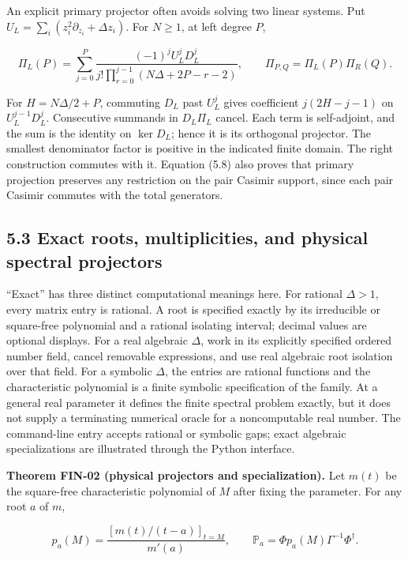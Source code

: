 \documentclass[a4paper,11pt]{article}
\numberwithin{equation}{section}
\begin{document}
An explicit primary projector often avoids solving two linear systems. Put \(U_L=\sum_i(z_i^2\partial_{z_i}+\Delta z_i)\). For \(N\ge1\), at left degree \(P\),

\[
\Pi_L(P)=\sum_{j=0}^{P}
\frac{(-1)^j U_L^jD_L^j}
{j!\prod_{r=0}^{j-1}(N\Delta+2P-r-2)},
\qquad \Pi_{P,Q}=\Pi_L(P)\Pi_R(Q).
\tag{5.8}
\]

For \(H=N\Delta/2+P\), commuting \(D_L\) past \(U_L^j\) gives coefficient \(j(2H-j-1)\) on \(U_L^{j-1}D_L^j\). Consecutive summands in \(D_L\Pi_L\) cancel. Each term is self-adjoint, and the sum is the identity on \(\ker D_L\); hence it is its orthogonal projector. The smallest denominator factor is positive in the indicated finite domain. The right construction commutes with it. Equation (5.8) also proves that primary projection preserves any restriction on the pair Casimir support, since each pair Casimir commutes with the total generators.

\hypertarget{exact-roots-multiplicities-and-physical-spectral-projectors}{%
\subsection{5.3 Exact roots, multiplicities, and physical spectral projectors}\label{exact-roots-multiplicities-and-physical-spectral-projectors}}

``Exact'' has three distinct computational meanings here. For rational \(\Delta>1\), every matrix entry is rational. A root is specified exactly by its irreducible or square-free polynomial and a rational isolating interval; decimal values are optional displays. For a real algebraic \(\Delta\), work in its explicitly specified ordered number field, cancel removable expressions, and use real algebraic root isolation over that field. For a symbolic \(\Delta\), the entries are rational functions and the characteristic polynomial is a finite symbolic specification of the family. At a general real parameter it defines the finite spectral problem exactly, but it does not supply a terminating numerical oracle for a noncomputable real number. The command-line entry accepts rational or symbolic gaps; exact algebraic specializations are illustrated through the Python interface.

\textbf{Theorem FIN-02 (physical projectors and specialization).} Let \(m(t)\) be the square-free characteristic polynomial of \(M\) after fixing the parameter. For any root \(a\) of \(m\),

\[
p_a(M)=\frac{[m(t)/(t-a)]_{t=M}}{m'(a)},
\qquad
\mathbb P_a=\Phi p_a(M)\Gamma^{-1}\Phi^\dagger.
\tag{5.9}
\]
\end{document}
